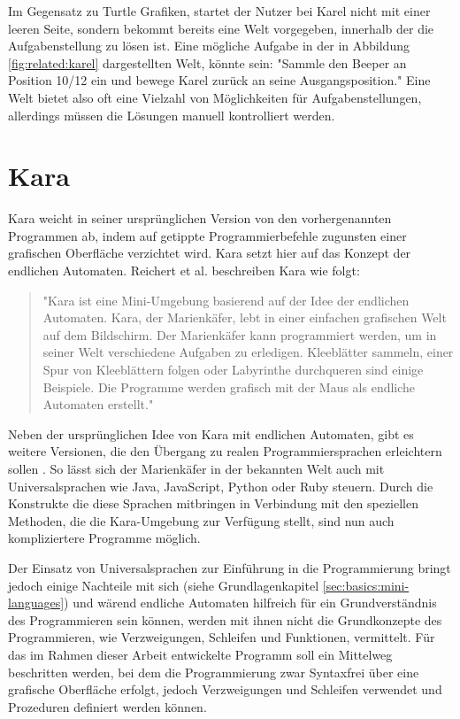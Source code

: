 Im Gegensatz zu Turtle Grafiken, startet der Nutzer bei Karel nicht mit einer leeren Seite, sondern bekommt bereits eine Welt vorgegeben, innerhalb der die Aufgabenstellung zu lösen ist. Eine mögliche Aufgabe in der in Abbildung \ref{fig:related:karel} dargestellten Welt, könnte sein: "Sammle den Beeper an Position 10/12 ein und bewege Karel zurück an seine Ausgangsposition." Eine Welt bietet also oft eine Vielzahl von Möglichkeiten für Aufgabenstellungen, allerdings müssen die Lösungen manuell kontrolliert werden.

\section{Kara}
\label{sec:related:kara}

Kara weicht in seiner ursprünglichen Version von den vorhergenannten Programmen ab, indem auf getippte Programmierbefehle zugunsten einer grafischen Oberfläche verzichtet wird. Kara setzt hier auf das Konzept der endlichen Automaten. Reichert et al. beschreiben Kara wie folgt:

\begin{quote}
    "Kara ist eine Mini-Umgebung basierend auf der Idee der endlichen Automaten. Kara, der Marienkäfer, lebt in einer einfachen grafischen Welt auf dem Bildschirm. Der Marienkäfer kann programmiert werden, um in seiner Welt verschiedene Aufgaben zu erledigen. Kleeblätter sammeln, einer Spur von Kleeblättern folgen oder Labyrinthe durchqueren sind einige Beispiele. Die Programme werden grafisch mit der Maus als endliche Automaten erstellt."~\cite[28]{reichert2004}
\end{quote}

Neben der ursprünglichen Idee von Kara mit endlichen Automaten, gibt es weitere Versionen, die den Übergang zu realen Programmiersprachen erleichtern sollen \cite{kara2017}. So lässt sich der Marienkäfer in der bekannten Welt auch mit Universalsprachen wie Java, JavaScript, Python oder Ruby steuern. Durch die Konstrukte die diese Sprachen mitbringen in Verbindung mit den speziellen Methoden, die die Kara-Umgebung zur Verfügung stellt, sind nun auch kompliziertere Programme möglich.

Der Einsatz von Universalsprachen zur Einführung in die Programmierung bringt jedoch einige Nachteile mit sich (siehe Grundlagenkapitel \ref{sec:basics:mini-languages}) und wärend endliche Automaten hilfreich für ein Grundverständnis des Programmieren sein können, werden mit ihnen nicht die Grundkonzepte des Programmieren, wie Verzweigungen, Schleifen und Funktionen, vermittelt. Für das im Rahmen dieser Arbeit entwickelte Programm soll ein Mittelweg beschritten werden, bei dem die Programmierung zwar Syntaxfrei über eine grafische Oberfläche erfolgt, jedoch Verzweigungen und Schleifen verwendet und Prozeduren definiert werden können.

